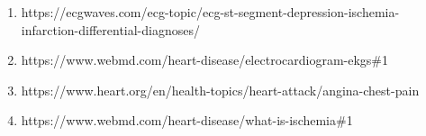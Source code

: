\documentclass[11pt]{article}
\providecommand{\tightlist}{%
      \setlength{\itemsep}{0pt}\setlength{\parskip}{0pt}}
\begin{document}
\begin{enumerate}
\def\labelenumi{\arabic{enumi}.}
\tightlist
\item
  https://ecgwaves.com/ecg-topic/ecg-st-segment-depression-ischemia-infarction-differential-diagnoses/
\item
  https://www.webmd.com/heart-disease/electrocardiogram-ekgs\#1
\item
  https://www.heart.org/en/health-topics/heart-attack/angina-chest-pain
\item
  https://www.webmd.com/heart-disease/what-is-ischemia\#1
\end{enumerate}


    
    
    
    
\end{document}
